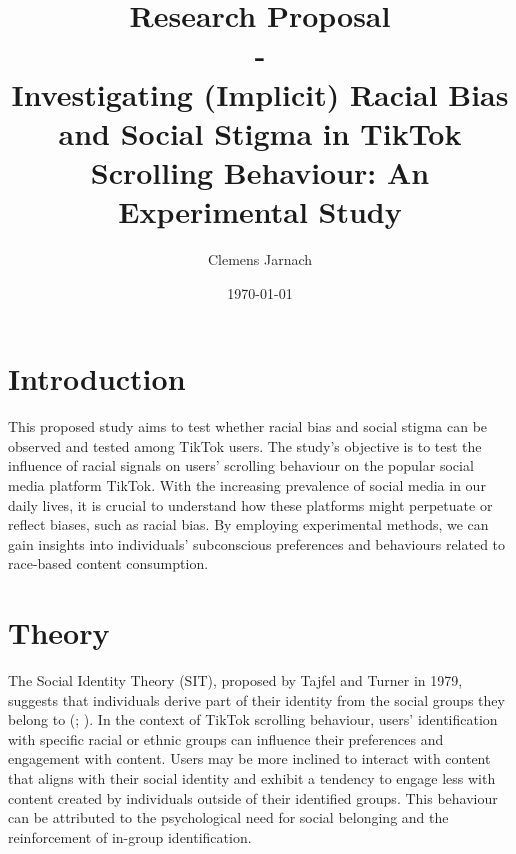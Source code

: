 \documentclass[a4paper, 12pt]{article}   %
\begin{document}

\title{Research Proposal \\
- \\
Investigating (Implicit) Racial Bias and Social Stigma in TikTok Scrolling Behaviour: An Experimental Study}     %
	 	
\author{Clemens Jarnach}	%
\date{\today}										%

\maketitle 											%




\section*{Introduction}
This proposed study aims to test whether racial bias and social stigma can be observed and tested among TikTok users. The study's objective is to test
the influence of racial signals on users' scrolling behaviour on the popular social media platform TikTok. With the increasing prevalence of social media in our daily lives, it is crucial to understand how these platforms might perpetuate or reflect biases, such as racial bias. By employing experimental methods, we can gain insights into individuals' subconscious preferences and behaviours related to race-based content consumption. 

\section*{Theory}
The Social Identity Theory (SIT), proposed by Tajfel and Turner in 1979, suggests that individuals derive part of their identity from the social groups they belong to (\cite{tajfelIntegrativeTheoryIntergroup1979}; \cite{TajfelHenri1981Hgas}). In the context of TikTok scrolling behaviour, users' identification with specific racial or ethnic groups can influence their preferences and engagement with content. Users may be more inclined to interact with content that aligns with their social identity and exhibit a tendency to engage less with content created by individuals outside of their identified groups. This behaviour can be attributed to the psychological need for social belonging and the reinforcement of in-group identification.
\end{document}
